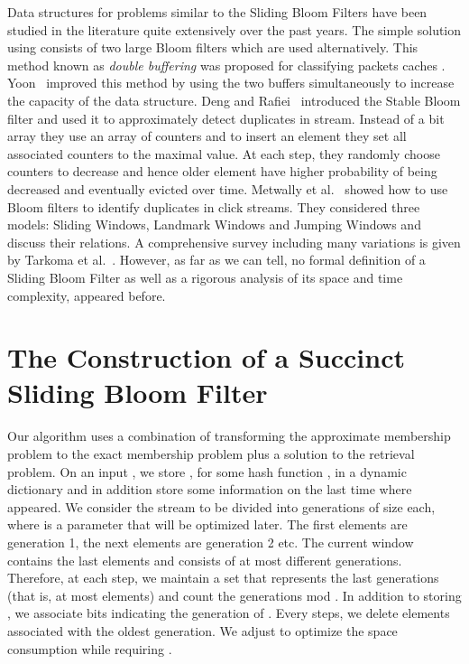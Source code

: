 \documentclass[11pt]{article}
\begin{document}
Data structures for problems similar to the Sliding Bloom Filters have been studied in the literature quite extensively over the past years. The simple solution using  consists of two large Bloom filters which are used alternatively. This method known as \emph{double buffering} was proposed for classifying packets caches \cite{ChangLF04}. Yoon~\cite{Yoon10} improved this method by using the two buffers simultaneously to increase the capacity of the data structure. Deng and Rafiei~\cite{DengR06} introduced the Stable Bloom filter and used it to approximately detect duplicates in stream. Instead of a bit array they use an array of counters and to insert an element they set all associated counters to the maximal value. At each step, they randomly choose counters to decrease and hence older element have higher probability of being decreased and eventually evicted over time. Metwally et al.~\cite{MetwallyAA05} showed how to use Bloom filters to identify duplicates in click streams. They considered three models: Sliding Windows, Landmark Windows and Jumping Windows and discuss their relations. A comprehensive survey including many variations is given by Tarkoma et al.~\cite{TarkomaRL12}. However, as far as we can tell, no formal definition of a Sliding Bloom Filter as well as a rigorous analysis of its space and time complexity, appeared before.

\section{The Construction of a Succinct Sliding Bloom Filter}\label{sec:contruction}

Our algorithm uses a combination of transforming the approximate membership problem to the exact membership problem plus a solution to the retrieval problem. On an input , we store , for some hash function , in a dynamic dictionary and in addition store some information on the last time where  appeared. We consider the stream to be divided into generations of size  each, where  is a parameter that will be optimized later. The first  elements are generation 1, the next  elements are generation 2 etc. The current window contains the last  elements and consists of at most  different generations. Therefore, at each step, we maintain a set  that represents the last  generations (that is, at most  elements) and count the generations mod . In addition to storing , we associate  bits indicating the generation of . Every  steps, we delete elements associated with the oldest generation. We adjust  to optimize the space consumption while requiring .
\end{document}
